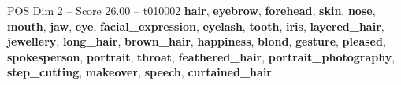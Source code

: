 \begin{textsample}{POS Dim 2 – Score 26.00 – t010002}  \label{ex:f2_pos_009}
\textbf{hair}, \textbf{eyebrow}, \textbf{forehead}, \textbf{skin}, \textbf{nose}, \textbf{mouth}, \textbf{jaw}, \textbf{eye}, \textbf{facial\_expression}, \textbf{eyelash}, \textbf{tooth}, \textbf{iris}, \textbf{layered\_hair}, \textbf{jewellery}, \textbf{long\_hair}, \textbf{brown\_hair}, \textbf{happiness}, \textbf{blond}, \textbf{gesture}, \textbf{pleased}, \textbf{spokesperson}, \textbf{portrait}, \textbf{throat}, \textbf{feathered\_hair}, \textbf{portrait\_photography}, \textbf{step\_cutting}, \textbf{makeover}, \textbf{speech}, \textbf{curtained\_hair}

\end{textsample}
